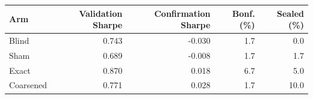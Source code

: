 \begin{tabular}{lrrrr}
\toprule
Arm & Validation Sharpe & Confirmation Sharpe & Bonf. (\%) & Sealed (\%) \\
\midrule
Blind & 0.743 & -0.030 & 1.7 & 0.0 \\
Sham & 0.689 & -0.008 & 1.7 & 1.7 \\
Exact & 0.870 & 0.018 & 6.7 & 5.0 \\
Coarsened & 0.771 & 0.028 & 1.7 & 10.0 \\
\bottomrule
\end{tabular}
